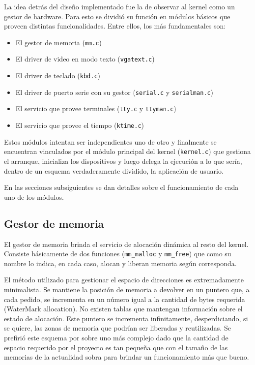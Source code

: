 \documentclass[11pt]{article}
\begin{document}
La idea detrás del diseño implementado fue la de observar al kernel como un gestor de hardware. Para esto se dividió su función en módulos básicos que proveen distintas funcionalidades. Entre ellos, los más fundamentales son:

\begin{itemize}
    \item El gestor de memoria (\texttt{mm.c})
    \item El driver de video en modo texto (\texttt{vgatext.c})
    \item El driver de teclado (\texttt{kbd.c})
    \item El driver de puerto serie con su gestor (\texttt{serial.c} y \texttt{serialman.c})
    \item El servicio que provee terminales (\texttt{tty.c} y \texttt{ttyman.c})
    \item El servicio que provee el tiempo (\texttt{ktime.c})
\end{itemize}

Estos módulos intentan ser independientes uno de otro y finalmente se encuentran vinculados por el módulo principal del kernel (\texttt{kernel.c}) que gestiona el arranque, inicializa los dispositivos y luego delega la ejecución a lo que sería, dentro de un esquema verdaderamente dividido, la aplicación de usuario.

En las secciones subsiguientes se dan detalles sobre el funcionamiento de cada uno de los módulos.

\subsection{Gestor de memoria}

El gestor de memoria brinda el servicio de alocación dinámica al resto del kernel. Consiste básicamente de dos funciones (\texttt{mm\_malloc} y \texttt{mm\_free}) que como su nombre lo indica, en cada caso, alocan y liberan memoria según corresponda.

El método utilizado para gestionar el espacio de direcciones es extremadamente minimalista. Se mantiene la posición de memoria a devolver en un puntero que, a cada pedido, se incrementa en un número igual a la cantidad de bytes requerida (WaterMark allocation). No existen tablas que mantengan información sobre el estado de alocación. Este puntero se incrementa infinitamente, desperdiciando, si se quiere, las zonas de memoria que podrían ser liberadas y reutilizadas. Se prefirió este esquema por sobre uno más complejo dado que la cantidad de espacio requerido por el proyecto es tan pequeña que con el tamaño de las memorias de la actualidad sobra para brindar un funcionamiento más que bueno.
\end{document}
